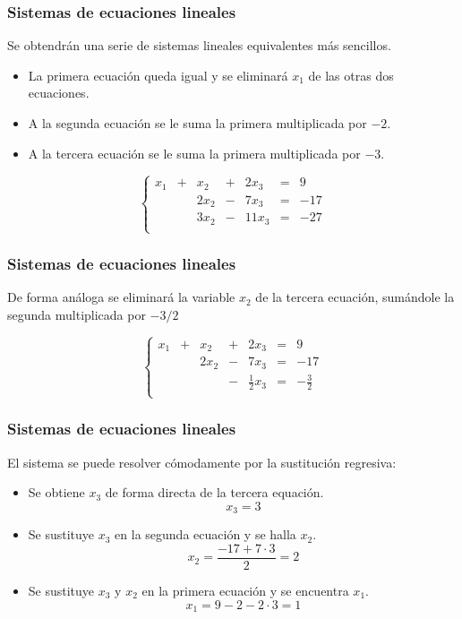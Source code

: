 \documentclass[aspectratio=169]{beamer}
\begin{document}
    
               \begin{frame}
    \frametitle{Sistemas de ecuaciones lineales}
Se obtendr\'an una serie de sistemas lineales equivalentes m\'as sencillos.
\begin{itemize}
\item La primera ecuaci\'on queda igual y se eliminar\'a $x_1$ de las otras dos ecuaciones.
\item A la segunda ecuaci\'on se le suma la primera multiplicada por $-2$.
\item A la tercera ecuaci\'on se le suma la primera multiplicada por $-3$.
\end{itemize}

\[\left\{\begin{array}{ccccccc}
x_1 & + & x_2 & + & 2x_3 & = & 9\\
 &  & 2x_2 & - & 7x_3 & = & -17\\
 &  & 3x_2 & - &  11x_3 & = & -27\\
\end{array}\right.\]

  \end{frame} 

               \begin{frame}
    \frametitle{Sistemas de ecuaciones lineales}
    De forma an\'aloga se eliminar\'a la variable $x_2$ de la tercera ecuaci\'on, sum\'andole la segunda multiplicada por $-3/2$
    
\[\left\{\begin{array}{ccccccc}
x_1 & + & x_2 & + & 2x_3 & = & 9\\
 &  & 2x_2 & - & 7x_3 & = & -17\\
 &  & & - &  \frac{1}{2}x_3 & = & -\frac{3}{2}\\
\end{array}\right.\]

  \end{frame} 
  
                 \begin{frame}
    \frametitle{Sistemas de ecuaciones lineales}
El sistema se puede resolver c\'omodamente por la sustituci\'on regresiva:
    \begin{itemize}
\item Se obtiene $x_3$ de forma directa de la tercera equaci\'on.
\[x_3 = 3\]
\item Se sustituye $x_3$ en la segunda ecuaci\'on y se halla $x_2$.
\[x_2 = \frac{-17+7\cdot 3}{2} = 2\]
\item Se sustituye $x_3$ y $x_2$ en la primera ecuaci\'on y se encuentra $x_1$.
\[x_1 = 9-2-2\cdot3 = 1\]
\end{itemize}
  \end{frame} 
\end{document}
